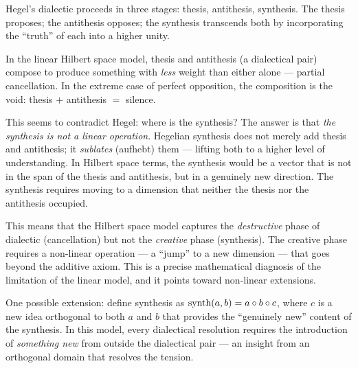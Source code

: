 \begin{interpretation}
\label{interp:hegel}
Hegel's dialectic proceeds in three stages: thesis, antithesis, synthesis.
The thesis proposes; the antithesis opposes; the synthesis transcends both by
incorporating the ``truth'' of each into a higher unity.

In the linear Hilbert space model, thesis and antithesis (a dialectical pair)
compose to produce something with \emph{less} weight than either alone ---
partial cancellation. In the extreme case of perfect opposition, the
composition is the void: thesis $+$ antithesis $=$ silence.

This seems to contradict Hegel: where is the synthesis? The answer is that
\emph{the synthesis is not a linear operation}. Hegelian synthesis does not
merely add thesis and antithesis; it \emph{sublates} (aufhebt) them --- lifting
both to a higher level of understanding. In Hilbert space terms, the synthesis
would be a vector that is not in the span of the thesis and antithesis, but in a
genuinely new direction. The synthesis requires moving to a dimension that
neither the thesis nor the antithesis occupied.

This means that the Hilbert space model captures the \emph{destructive} phase
of dialectic (cancellation) but not the \emph{creative} phase (synthesis). The
creative phase requires a non-linear operation --- a ``jump'' to a new dimension
--- that goes beyond the additive axiom. This is a precise mathematical diagnosis
of the limitation of the linear model, and it points toward non-linear extensions.

One possible extension: define synthesis as
$\text{synth}(a, b) = a \circ b \circ c$, where $c$ is a new idea
orthogonal to both $a$ and $b$ that provides the ``genuinely new'' content of
the synthesis. In this model, every dialectical resolution requires the
introduction of \emph{something new} from outside the dialectical pair ---
an insight from an orthogonal domain that resolves the tension.
\end{interpretation}

